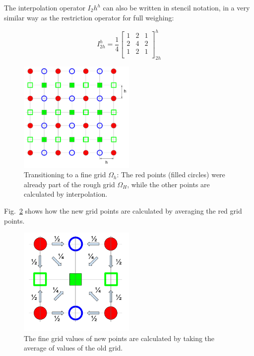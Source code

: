 The interpolation operator $I_2h^h$ can also be written in stencil notation, in a very similar way as the restriction operator for full weighing:

\begin{equation}
I_{2h}^h = \frac{1}{4} \begin{bmatrix}
1 & 2 & 1\\
2 & 4 & 2\\
1 & 2 & 1\\
\end{bmatrix}_{2h}^{h} 
\end{equation}

\begin{figure}[h]
	\centering
	\includegraphics[width=0.5\textwidth]{chapters/chapter02/mg_prolongation_grid}
	\caption{Transitioning to a fine grid $\Omega_h$: The red points (filled circles) were already part of the rough grid $\Omega_H$, while the other points are calculated by interpolation.}
	\label{fig:mg_prolongation_grid}
\end{figure}

Fig.~\ref{fig:mg_prolongation} shows how the new grid points are calculated by averaging the red grid points.

\begin{figure}[h]
	\centering
	\includegraphics[width=0.5\textwidth]{chapters/chapter02/mg_prolongation}
	\caption{The fine grid values of new points are calculated by taking the average of values of the old grid.}
	\label{fig:mg_prolongation}
\end{figure}


